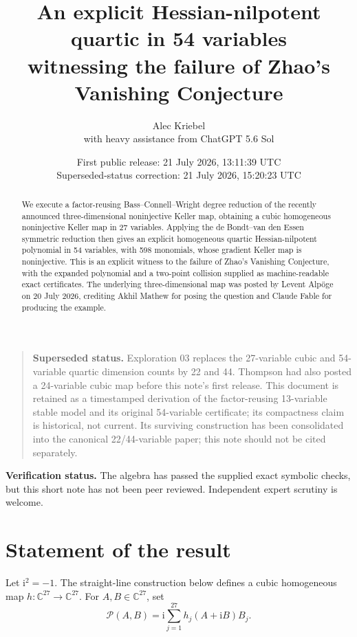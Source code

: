 \documentclass[11pt]{article}
\title{An explicit Hessian-nilpotent quartic in 54 variables\\
witnessing the failure of Zhao's Vanishing Conjecture}
\author{Alec Kriebel\\[2pt]\large with heavy assistance from ChatGPT 5.6 Sol}
\date{First public release: 21 July 2026, 13:11:39 UTC\\
Superseded-status correction: 21 July 2026, 15:20:23 UTC}
\newcommand{\C}{\mathbb C}
\newcommand{\cP}{\mathcal P}
\newcommand{\ii}{\mathrm i}
\begin{document}
\maketitle

\begin{quote}
\textbf{Superseded status.} Exploration 03 replaces the 27-variable cubic and
54-variable quartic dimension counts by 22 and 44. Thompson had also posted a
24-variable cubic map before this note's first release. This document is
retained as a timestamped derivation of the factor-reusing 13-variable stable
model and its original 54-variable certificate; its compactness claim is
historical, not current. Its surviving construction has been consolidated into
the canonical 22/44-variable paper; this note should not be cited separately.
\end{quote}

\begin{abstract}
We execute a factor-reusing Bass--Connell--Wright degree reduction of the
recently announced three-dimensional noninjective Keller map, obtaining a
cubic homogeneous noninjective Keller map in 27 variables.  Applying the de
Bondt--van den Essen symmetric reduction then gives an explicit homogeneous
quartic Hessian-nilpotent polynomial in 54 variables, with 598 monomials, whose
gradient Keller map is noninjective.  This is an explicit witness to the
failure of Zhao's Vanishing Conjecture, with the expanded polynomial and a
two-point collision supplied as machine-readable exact certificates.  The
underlying three-dimensional map was posted by Levent Alpöge on 20 July 2026,
crediting Akhil Mathew for posing the question and Claude Fable for producing
the example.
\end{abstract}

\noindent\textbf{Verification status.}
The algebra has passed the supplied exact symbolic checks, but this short note
has not been peer reviewed. Independent expert scrutiny is welcome.

\section{Statement of the result}

Let $\ii^2=-1$.  The straight-line construction below defines a cubic
homogeneous map $h:\C^{27}\to\C^{27}$.  For $A,B\in\C^{27}$, set
\begin{equation}
  \boxed{\cP(A,B)=\ii\sum_{j=1}^{27}h_j(A+\ii B)B_j.}
  \label{eq:potential}
\end{equation}
\end{document}
